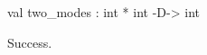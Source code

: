 \runverbatimtrue
{}
\begin{RunVerbatimMsg}
val two_modes : int * int -D-> int
\end{RunVerbatimMsg}
\begin{RunVerbatimErr}
Success.
\end{RunVerbatimErr}

